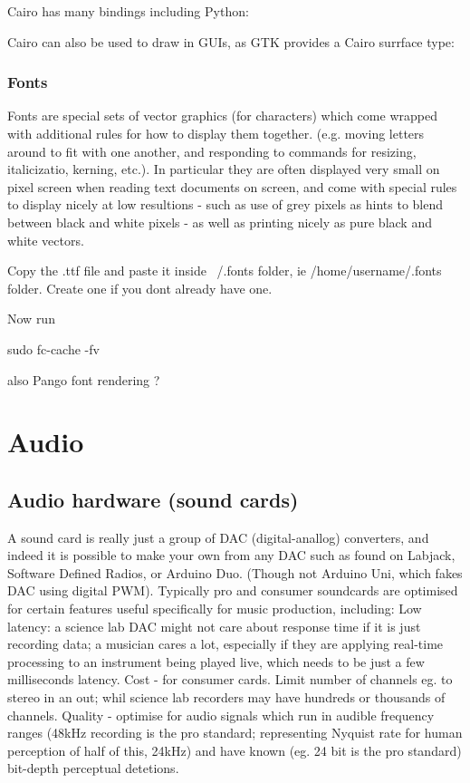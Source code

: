 \documentclass[oneside,english]{scrbook}
\begin{document}


Cairo has many bindings including Python:



Cairo can also be used to draw in GUIs, as GTK provides a Cairo surrface type:



\section{Fonts}

Fonts are special sets of vector graphics (for characters) which come wrapped with additional rules for how to display them together. (e.g. moving letters around to fit with one another, and responding to commands for resizing, italicizatio, kerning, etc.). In particular they are often displayed very small on pixel screen when reading text documents on screen, and come with special rules to display nicely at low resultions - such as use of grey pixels as hints to blend between black and white pixels - as well as printing nicely as pure black and white vectors.

Copy the .ttf file and paste it inside ~/.fonts folder, ie /home/username/.fonts folder. Create one if you dont already have one.

Now run

sudo fc-cache -fv


also Pango font rendering ?


\part{Audio}


\chapter{Audio hardware (sound cards)}

A sound card is really just a group of DAC (digital-anallog) converters, and indeed it is possible to make your own from any DAC such as found on Labjack, Software Defined Radios, or Arduino Duo. (Though not Arduino Uni, which fakes DAC using digital PWM).   Typically pro and consumer soundcards are optimised for certain features useful specifically for music production, including:
Low latency: a science lab DAC might not care about response time if it is just recording data; a musician cares a lot, especially if they are applying real-time processing to an instrument being played live, which needs to be just a few milliseconds latency.
Cost - for consumer cards. Limit number of channels eg. to stereo in an out; whil science lab recorders may have hundreds or thousands of channels.
Quality - optimise for audio signals which run in audible frequency ranges (48kHz recording is the pro standard; representing Nyquist rate for human perception of half of this, 24kHz) and have known (eg. 24 bit is the pro standard) bit-depth perceptual detetions.
\end{document}
